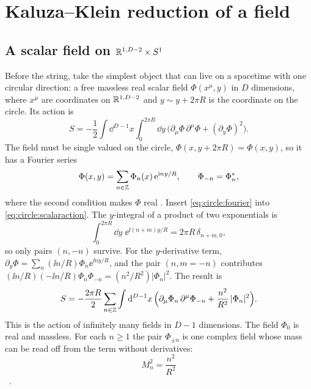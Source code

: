\section{Kaluza--Klein reduction of a field}\label{sec:circle:kk}

\subsection{A scalar field on \texorpdfstring{$\mathbb{R}^{1,D-2}\times S^1$}{R x S1}}

Before the string, take the simplest object that can live on a spacetime with one circular
direction: a free massless real scalar field $\Phi(x^\mu,y)$ in $D$ dimensions, where
$x^\mu$ are coordinates on $\mathbb{R}^{1,D-2}$ and $y\sim y+2\pi R$ is the coordinate on the circle.
Its action is
\begin{equation}\label{eq:circle:scalaraction}
 S=-\frac12\int\dd^{D-1}x\int_0^{2\pi R}\dd y\,
   \Big(\partial_\mu\Phi\,\partial^\mu\Phi+(\partial_y\Phi)^2\Big).
\end{equation}
The field must be single valued on the circle, $\Phi(x,y+2\pi R)=\Phi(x,y)$, so it has a
Fourier series
\begin{equation}\label{eq:circle:fourier}
 \Phi(x,y)=\sum_{n\in\mathbb{Z}}\Phi_n(x)\,\mathrm{e}^{\mathrm{i} ny/R},\qquad \Phi_{-n}=\Phi_n^{*},
\end{equation}
where the second condition makes $\Phi$ real . Insert
\eqref{eq:circle:fourier} into \eqref{eq:circle:scalaraction}. The $y$-integral of a product of
two exponentials is
\[
 \int_0^{2\pi R}\dd y\;\ee^{\ii(n+m)y/R}=2\pi R\,\delta_{n+m,0},
\]
so only pairs $(n,-n)$ survive. For the $y$-derivative term,
$\partial_y\Phi=\sum_n(\ii n/R)\Phi_n\ee^{\ii ny/R}$, and the pair $(n,m=-n)$ contributes
$(\ii n/R)(-\ii n/R)\Phi_n\Phi_{-n}=(n^2/R^2)|\Phi_n|^2$. The result is
\begin{equation}\label{eq:circle:kkaction}
 S=-\frac{2\pi R}{2}\sum_{n\in\mathbb{Z}}\int\mathrm{d}^{D-1}x\,
   \Big(\partial_\mu\Phi_n\,\partial^\mu\Phi_{-n}+\frac{n^2}{R^2}\,|\Phi_n|^2\Big).
\end{equation}
This is the action of infinitely many fields in $D-1$ dimensions. The field $\Phi_0$ is real
and massless. For each $n\ge1$ the pair $\Phi_{\pm n}$ is one complex field whose mass can be
read off from the term without derivatives:
\begin{equation}\label{eq:circle:kkmass}
 M_n^2=\frac{n^2}{R^2}
\end{equation}
\TL\ .

